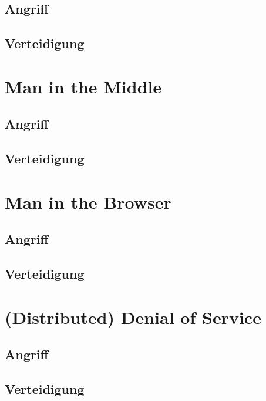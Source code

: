 \subsection{Angriff}
\blindtext

\subsection{Verteidigung}
\blindtext


\section{Man in the Middle}
\blindtext

\subsection{Angriff}
\blindtext

\subsection{Verteidigung}
\blindtext


\section{Man in the Browser}
\blindtext

\subsection{Angriff}
\blindtext

\subsection{Verteidigung}
\blindtext


\section{(Distributed) Denial of Service}
\blindtext

\subsection{Angriff}
\blindtext

\subsection{Verteidigung}
\blindtext